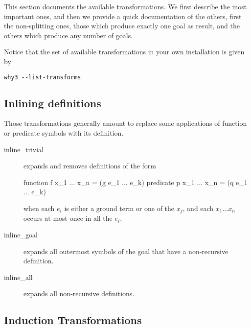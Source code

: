 This section documents the available transformations. We first
describe the most important ones, and then we provide a quick
documentation of the others, first the non-splitting ones, \eg those
which produce exactly one goal as result, and the others which produce any
number of goals.

Notice that the set of available transformations in your own
installation is given by
\begin{verbatim}
why3 --list-transforms
\end{verbatim}

\subsection{Inlining definitions}

Those transformations generally amount to replace some applications of
function or predicate symbols with its definition.

\begin{description}

\item[inline\_trivial]
  expands and removes definitions of the form
\begin{whycode}
function  f x_1 ... x_n = (g e_1 ... e_k)
predicate p x_1 ... x_n = (q e_1 ... e_k)
\end{whycode}
when each $e_i$ is either a ground term or one of the $x_j$, and
each $x_1 \dots x_n$ occurs at most once in all the $e_i$.

\item[inline\_goal] expands all outermost symbols of the goal that
  have a non-recursive definition.

\item[inline\_all]
  expands all non-recursive definitions.

\end{description}


\subsection{Induction Transformations}

